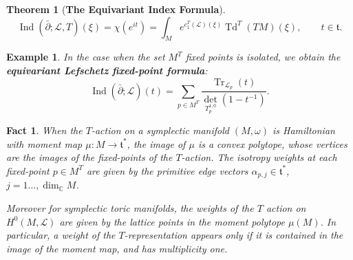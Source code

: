 \documentclass{article}
\newtheorem{theorem}{Theorem}[section]
\newtheorem{example}{Example}
\newtheorem{fact}{Fact}
\newcommand{\ra}{\rightarrow}
\newcommand{\w}{\omega}
\newcommand{\CC}{\mathbb{C}}
\newcommand{\mcL}{\mathcal{L}}
\newcommand{\mft}{\mathfrak{t}}
\DeclareMathOperator{\Tr}{Tr}
\DeclareMathOperator{\Td}{Td}
\DeclareMathOperator{\Ind}{Ind}
\begin{document}
\begin{theorem}[\textbf{The Equivariant Index Formula}]
	\begin{equation*}
		\Ind(\bar{\partial}; \mcL, T)(\xi) = \chi(e^{it}) = \int_{M} e^{c_{1}^{T}(\mcL)(\xi)} \Td^{T}(TM)(\xi), \qquad t \in \mft.
	\end{equation*}
\end{theorem}

\begin{example}
	In the case when the set $M^{T}$ fixed points is isolated, we obtain the \textbf{equivariant Lefschetz fixed-point formula}:
	\begin{equation*}
		\Ind(\bar{\partial}; \mcL)(t) = \sum\limits_{p \in M^{T}} \frac{\Tr_{\mcL_{p}}(t)}{\det_{T_{p}^{1,0}}(1 - t^{-1})}.
	\end{equation*}
\end{example}

\begin{fact}
	When the $T$-action on a symplectic manifold $(M, \w)$ is Hamiltonian with moment map $\mu : M \ra \mft^{\ast}$, the image of $\mu$ is a convex polytope, whose vertices are the images of the fixed-points of the $T$-action. The isotropy weights at each fixed-point $p \in M^{T}$ are given by the primitive edge vectors $\alpha_{p,j} \in \mft^{\ast}$, $j = 1\ldots, \dim_{\CC} M$.
	
	Moreover for symplectic toric manifolds, the weights of the $T$ action on $H^{0}(M, \mcL)$ are given by the lattice points in the moment polytope $\mu(M)$. In particular, a weight of the $T$-representation appears only if it is contained in the image of the moment map, and has multiplicity one.
\end{fact}
\end{document}
